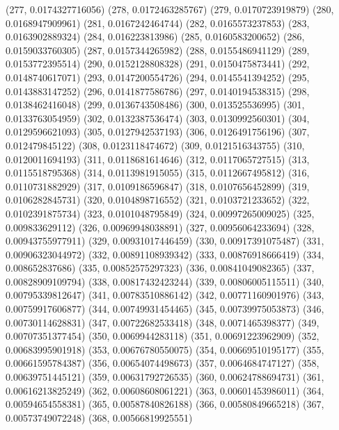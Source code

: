 {					(277, 0.0174327716056)
					(278, 0.0172463285767)
					(279, 0.0170723919879)
					(280, 0.0168947909961)
					(281, 0.0167242464744)
					(282, 0.0165573237853)
					(283, 0.0163902889324)
					(284, 0.016223813986)
					(285, 0.0160583200652)
					(286, 0.0159033760305)
					(287, 0.0157344265982)
					(288, 0.0155486941129)
					(289, 0.0153772395514)
					(290, 0.0152128808328)
					(291, 0.0150475873441)
					(292, 0.0148740617071)
					(293, 0.0147200554726)
					(294, 0.0145541394252)
					(295, 0.0143883147252)
					(296, 0.0141877586786)
					(297, 0.0140194538315)
					(298, 0.0138462416048)
					(299, 0.0136743508486)
					(300, 0.013525536995)
					(301, 0.0133763054959)
					(302, 0.0132387536474)
					(303, 0.0130992560301)
					(304, 0.0129596621093)
					(305, 0.0127942537193)
					(306, 0.0126491756196)
					(307, 0.012479845122)
					(308, 0.0123118474672)
					(309, 0.0121516343755)
					(310, 0.0120011694193)
					(311, 0.0118681614646)
					(312, 0.0117065727515)
					(313, 0.0115518795368)
					(314, 0.0113981915055)
					(315, 0.0112667495812)
					(316, 0.0110731882929)
					(317, 0.0109186596847)
					(318, 0.0107656452899)
					(319, 0.0106282845731)
					(320, 0.0104898716552)
					(321, 0.0103721233652)
					(322, 0.0102391875734)
					(323, 0.0101048795849)
					(324, 0.00997265009025)
					(325, 0.009833629112)
					(326, 0.00969948038891)
					(327, 0.00956064233694)
					(328, 0.00943755977911)
					(329, 0.00931017446459)
					(330, 0.00917391075487)
					(331, 0.00906323044972)
					(332, 0.00891108939342)
					(333, 0.00876918666419)
					(334, 0.008652837686)
					(335, 0.00852575297323)
					(336, 0.00841049082365)
					(337, 0.00828909109794)
					(338, 0.00817432423244)
					(339, 0.00806005115511)
					(340, 0.00795339812647)
					(341, 0.00783510886142)
					(342, 0.00771160901976)
					(343, 0.00759917606877)
					(344, 0.00749931454465)
					(345, 0.00739975053873)
					(346, 0.00730114628831)
					(347, 0.00722682533418)
					(348, 0.0071465398377)
					(349, 0.00707351377454)
					(350, 0.0069944283118)
					(351, 0.00691223962909)
					(352, 0.00683995901918)
					(353, 0.00676780550075)
					(354, 0.00669510195177)
					(355, 0.00661595784387)
					(356, 0.00654074498673)
					(357, 0.0064684747127)
					(358, 0.00639751445121)
					(359, 0.00631792726535)
					(360, 0.00624788694731)
					(361, 0.00616213825249)
					(362, 0.00608608061221)
					(363, 0.00601453986011)
					(364, 0.00594654558381)
					(365, 0.00587840826188)
					(366, 0.00580849665218)
					(367, 0.00573749072248)
					(368, 0.00566819925551)
}
